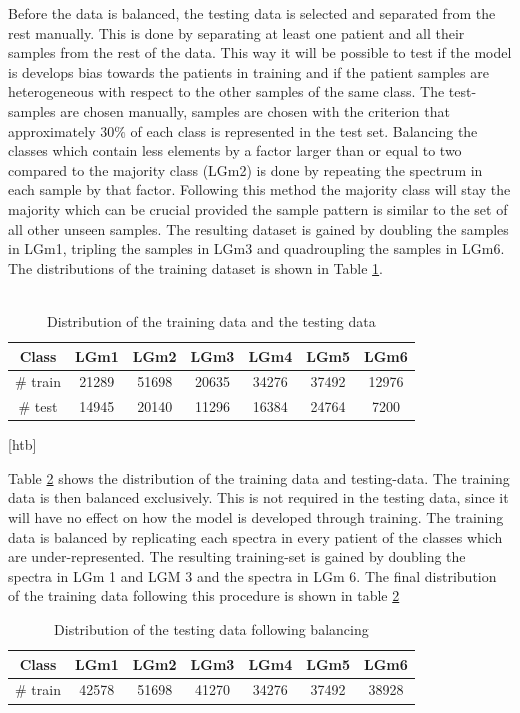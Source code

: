 Before the data is balanced, the testing data is selected and separated from the rest manually. This is done by separating at least one patient and all their samples from the rest of the data. This way it will be possible to test if the model is develops bias towards the patients in training and if the patient samples are heterogeneous with respect to the other samples of the same class. The test-samples are chosen manually, samples are chosen with the criterion that approximately $30\%$ of each class is represented in the test set. Balancing the classes which contain less elements by a factor larger than or equal to two compared to the majority class (LGm2) is done by repeating the spectrum in each sample by that factor. Following this method the majority class will stay the majority which can be crucial provided the sample pattern is similar to the set of all other unseen samples. The resulting dataset is gained by doubling the samples in LGm1, tripling the samples in LGm3 and quadroupling the samples in LGm6. The distributions of the training dataset is shown in Table \ref{table:2}.
\\
\\
\begin{table}[htb]
\centering
 \begin{tabular}{||c c c c c c c||} 
 \hline
 Class & LGm1 & LGm2 & LGm3 & LGm4 & LGm5 & LGm6 \\ [0.5ex] 
 \hline\hline
 \# train & 21289	& 51698	& 20635	& 34276	& 37492	& 12976 \\
 \hline 
 \# test & 14945 & 20140 & 11296 & 16384 & 24764 & 7200 \\
 \hline

\end{tabular}[htb]
\caption{Distribution of the training data and the testing data}
\label{table:2}
\end{table}

Table \ref{table:3} shows the distribution of the training data and testing-data. The training data is then balanced exclusively. This is not required in the testing data, since it will have no effect on how the model is developed through training. The training data is balanced by replicating each spectra in every patient of the classes which are under-represented. The resulting training-set is gained by doubling the spectra in LGm 1 and LGM 3 and  the spectra in LGm 6. The final distribution of the training data following this procedure is shown in table \ref{table:3}

\begin{table}[htb]
\centering
 \begin{tabular}{||c c c c c c c||} 
 \hline
 Class & LGm1 & LGm2 & LGm3 & LGm4 & LGm5 & LGm6 \\ [0.5ex] 
 \hline\hline
 \# train & 42578 & 51698 & 41270 & 34276 & 37492 & 38928 \\
 \hline 

\end{tabular}
\caption{Distribution of the testing data following balancing}
\label{table:3}
\end{table}

